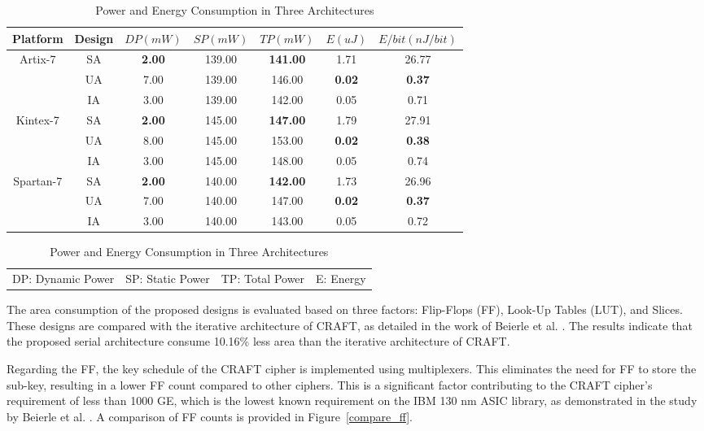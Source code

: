 \documentclass[final,5p,times,twocolumn]{elsarticle}
\begin{document}
\begin{table}
    \begin{threeparttable}
        \caption{Power and Energy Consumption in Three Architectures}\label{power_energy_compare}%
        \begin{tabular*}{\textwidth}{@{\extracolsep\fill}|c|c|c|c|c|c|c|}
            \hline
            Platform & Design & $DP(mW)$ & $SP(mW)$ & $TP(mW)$ & $E(uJ)$ & $E/bit(nJ/bit)$ \\
            \hline
            \multirow{3}{*}{Artix-7}  & SA & \textbf{2.00} & 139.00 & \textbf{141.00} & 1.71 & 26.77 \\
            & UA & 7.00 & 139.00 & 146.00 & \textbf{0.02} & \textbf{0.37} \\
            & IA & 3.00 & 139.00 & 142.00 & 0.05 & 0.71 \\
            \hline
            \multirow{3}{*}{Kintex-7} & SA & \textbf{2.00} & 145.00 & \textbf{147.00} & 1.79 & 27.91 \\
            & UA & 8.00 & 145.00 & 153.00 & \textbf{0.02} & \textbf{0.38} \\
            & IA & 3.00 & 145.00 & 148.00 & 0.05 & 0.74 \\
            \hline
            \multirow{3}{*}{Spartan-7} & SA & \textbf{2.00} & 140.00 & \textbf{142.00} & 1.73 & 26.96 \\
            & UA & 7.00 & 140.00 & 147.00 & \textbf{0.02} & \textbf{0.37} \\
            & IA & 3.00 & 140.00 & 143.00 & 0.05 & 0.72 \\
            \hline
        \end{tabular*}
        \begin{tabular}{llll}
            DP: Dynamic Power & SP: Static Power & TP: Total Power & E: Energy
        \end{tabular}
    \end{threeparttable}
\end{table}


The area consumption of the proposed designs is evaluated based on three factors: Flip-Flops (FF), Look-Up Tables (LUT), and Slices. These designs are compared with the iterative architecture of CRAFT, as detailed in the work of Beierle et al. \cite{Beierle2019}. The results indicate that the proposed serial architecture consume 10.16\% less area than the iterative architecture of CRAFT.


Regarding the FF, the key schedule of the CRAFT cipher is implemented using multiplexers. This eliminates the need for FF to store the sub-key, resulting in a lower FF count compared to other ciphers. This is a significant factor contributing to the CRAFT cipher's requirement of less than 1000 GE, which is the lowest known requirement on the IBM 130 nm ASIC library, as demonstrated in the study by Beierle et al. \cite{Beierle2019}. A comparison of FF counts is provided in Figure~\ref{compare_ff}.
\end{document}
